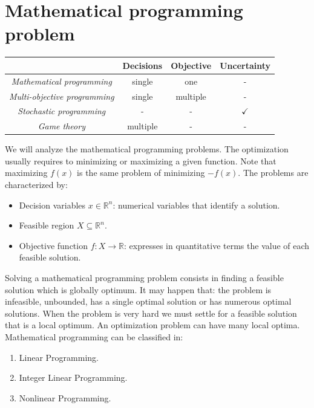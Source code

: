 \documentclass[12pt, a4paper]{report}
\newtheorem[style=M,bodystyle=\normalfont]{theorem}{Theorem}
\newtheorem[style=M,bodystyle=\normalfont]{corollary}{Corollary}
\newtheorem[style=M,bodystyle=\normalfont]{lemma}{Lemma}
\newtheorem[style=M,bodystyle=\normalfont]{definition}{Definition}
\begin{document}
    \section{Mathematical programming problem}
    \begin{table}[H]
        \centering
        \begin{tabular}{c|ccc|}
        \cline{2-4}
                                                                   & \textbf{Decisions} & \textbf{Objective} & \textbf{Uncertainty} \\ \hline
        \multicolumn{1}{|c|}{\textit{Mathematical programming}}    & single                   & one                          & -                    \\
        \multicolumn{1}{|c|}{\textit{Multi-objective programming}} & single                   & multiple                     & -                    \\
        \multicolumn{1}{|c|}{\textit{Stochastic programming}}      & -                        & -                            & $\checkmark$         \\
        \multicolumn{1}{|c|}{\textit{Game theory}}                 & multiple                 & -                            & -                    \\ \hline
        \end{tabular}
    \end{table}
    We will analyze the mathematical programming problems. 
    The optimization usually requires to minimizing or maximizing a given function. 
    Note that maximizing $f(x)$ is the same problem of minimizing $-f(x)$. The problems are characterized by: 
    \begin{itemize}
        \item Decision variables $x \in \mathbb{R}^n$: numerical variables that identify a solution. 
        \item Feasible region $X \subseteq \mathbb{R}^n$.
        \item Objective function $f:X \rightarrow\mathbb{R}$: expresses in quantitative terms the value of each feasible solution. 
    \end{itemize}
    Solving a mathematical programming problem consists in finding a feasible solution which is globally optimum. It may happen that: the problem is infeasible, unbounded, has a single 
    optimal solution or has numerous optimal solutions. 
    When the problem is very hard we must settle for a feasible solution that is a local optimum. An optimization problem can have many local optima. 
    Mathematical programming can be classified in:
    \begin{enumerate}
        \item Linear Programming.
        \item Integer Linear Programming.
        \item Nonlinear Programming. 
    \end{enumerate}
    
\end{document}
